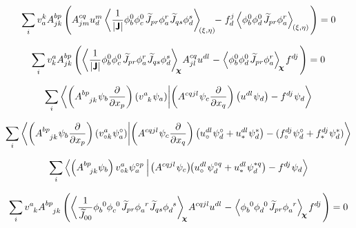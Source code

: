 \begin{equation}
   \sum_i v^k_a A^{bp}_{jk} \left(A^{cq}_{jm} u^m_d \left\langle \frac{1}{|\bm{\mathsf{J}}|} \phi^0_b \phi^0_c \mkern2mu \widetilde{J}_{pr}  \phi^r_a \mkern1mu \widetilde{J}_{qs}  \phi^s_d \right\rangle_{\mkern-4mu(\xi, \eta)} \mkern-6mu - \mkern1mu f^j_d \left\langle\phi^0_b \phi^0_d \mkern2mu \widetilde{J}_{pr}  \phi^r_a \right\rangle_{\mkern-2mu(\xi, \eta)} \mkern2mu \right) = 0
\end{equation}

\begin{equation}
   \sum_i v^a_k A^{bp}_{jk} \left( \left\langle \frac{1}{|\bm{\mathsf{J}}|} \phi^0_b \phi^0_c \mkern2mu \widetilde{J}_{pr}  \phi^r_a \mkern1mu \widetilde{J}_{qs}  \phi^s_d \right\rangle_{\mkern-5mu\bm{\chi}} \mkern-2mu A^{cq}_{jl} u^{dl} \mkern1mu - \mkern1mu \left\langle\phi^0_b \phi^0_d \mkern2mu \widetilde{J}_{pr}  \phi^r_a \right\rangle_{\mkern-3mu\bm{\chi}} \mkern-1mu f^{dj} \mkern2mu \right) = 0
\end{equation}

\begin{equation}
   \sum_i \bra{\left(A^{bp}_{\phantom{bp}jk} \mkern1mu \psi_b \frac{\partial}{\partial x_p}\right) \left(v^a_{\phantom{a}k} \mkern1mu \psi_a\right)}\ket{\left(A^{cqjl} \mkern1mu \psi_c \frac{\partial}{\partial x_q}\right) \left(u^{dl} \mkern1mu \psi_d\right) - f^{dj} \mkern1mu \psi_d}
\end{equation}

\begin{equation}
   \sum_i \bra{\left(A^{bp}_{\phantom{bp}jk} \mkern1mu \psi_b \frac{\partial}{\partial x_p}\right) \left(v^a_{\circ k} \mkern1mu \psi^\circ_a\right)}\ket{\left(A^{cqjl} \mkern1mu \psi_c \frac{\partial}{\partial x_q}\right) \left(u^{dl}_\circ \mkern1mu \psi^\circ_d + u^{dl}_\ast \mkern1mu \psi^\ast_d \right) - (f^{dj}_\circ \mkern1mu \psi^\circ_d + f^{dj}_\ast \mkern1mu \psi^\ast_d)}
\end{equation}

\begin{equation*}
   \sum_i \bra{\left( A^{bp}_{\mkern14mu jk} \psi_b \right) v^a_{\circ k} \psi^{\circ p}_a \mkern4mu}\ket{\mkern2mu \left(A^{cqjl} \mkern1mu \psi_c \right) \mkern-5mu \left(u^{dl}_\circ \mkern1mu \psi^{\circ q}_d + u^{dl}_\ast \mkern1mu \psi^{\ast q}_d \right) - f^{dj} \mkern1mu \psi_d}
\end{equation*}

\begin{equation}
   \sum_i v^a_{\phantom{a}k} A^{bp}_{\phantom{bp}jk} \left( \left\langle \frac{1}{\widetilde{J}_{00}} \phi^{\phantom{b}0}_b \phi^{\phantom{c}0}_c \mkern2mu \widetilde{J}_{pr}  \phi^{\phantom{a}r}_a \mkern1mu \widetilde{J}_{qs}  \phi^{\phantom{d}s}_d \right\rangle_{\mkern-5mu\bm{\chi}} \mkern-2mu A^{cqjl} u^{dl} \mkern1mu - \mkern1mu \left\langle\phi^{\phantom{b}0}_b \phi^{\phantom{d}0}_d \mkern2mu \widetilde{J}_{pr}  \phi^{\phantom{a}r}_a \right\rangle_{\mkern-3mu\bm{\chi}} \mkern-1mu f^{dj} \mkern2mu \right) = 0
\end{equation}

